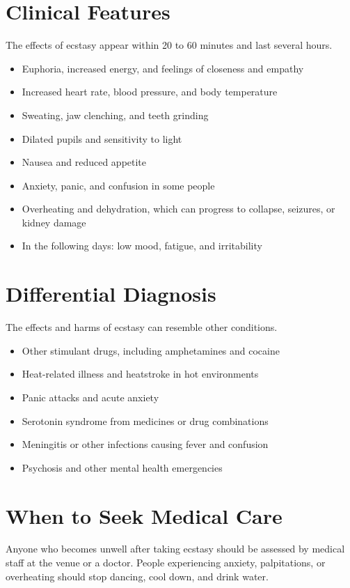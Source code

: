 \section*{Clinical Features}
The effects of ecstasy appear within 20 to 60 minutes and last several hours.
\begin{itemize}
    \item Euphoria, increased energy, and feelings of closeness and empathy
    \item Increased heart rate, blood pressure, and body temperature
    \item Sweating, jaw clenching, and teeth grinding
    \item Dilated pupils and sensitivity to light
    \item Nausea and reduced appetite
    \item Anxiety, panic, and confusion in some people
    \item Overheating and dehydration, which can progress to collapse, seizures, or kidney damage
    \item In the following days: low mood, fatigue, and irritability
\end{itemize}

\section*{Differential Diagnosis}
The effects and harms of ecstasy can resemble other conditions.
\begin{itemize}
    \item Other stimulant drugs, including amphetamines and cocaine
    \item Heat-related illness and heatstroke in hot environments
    \item Panic attacks and acute anxiety
    \item Serotonin syndrome from medicines or drug combinations
    \item Meningitis or other infections causing fever and confusion
    \item Psychosis and other mental health emergencies
\end{itemize}

\section*{When to Seek Medical Care}
Anyone who becomes unwell after taking ecstasy should be assessed by medical staff at the venue or a doctor. People experiencing anxiety, palpitations, or overheating should stop dancing, cool down, and drink water.

